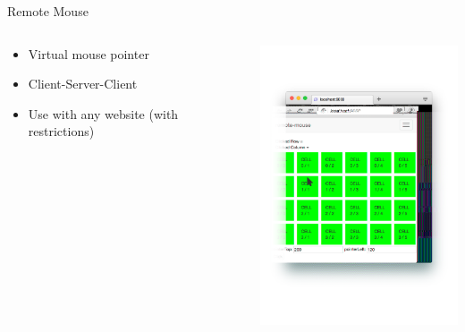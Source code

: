 \documentclass[first=dgreen,second=purple,logo=blueque,finnish]{aaltoslides}
\begin{document}
\begin{frame}{Remote Mouse}

\begin{columns}
\begin{column}{.5\linewidth}

\begin{itemize}
\item Virtual mouse pointer
\item Client-Server-Client
\item Use with any website (with restrictions)
\end{itemize}

\end{column}
\begin{column}{.5\linewidth}
\includegraphics[width=6cm]{screenshot}
\end{column}
\end{columns}

\end{frame}

\end{document}
